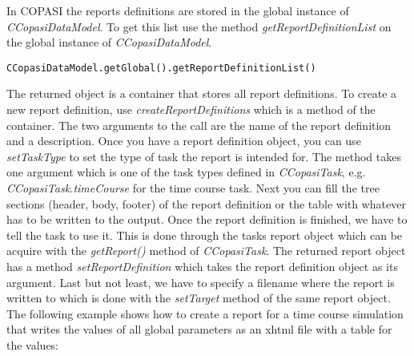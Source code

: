 \documentclass[a4,10pt]{article}
\begin{document}
In COPASI the reports definitions are stored in the global instance of \textit{CCopasiDataModel}. To get this list use the method \textit{getReportDefinitionList} on the global instance of \textit{CCopasiDataModel}.

\begin{verbatim}
CCopasiDataModel.getGlobal().getReportDefinitionList()
\end{verbatim}

The returned object is a container that stores all report definitions. To create a new report definition, use \textit{createReportDefinitions} which is a method of the container. The two arguments to the call are the name of the report definition and a description. Once you have a report definition object, you can use \textit{setTaskType} to set the type of task the report is intended for. The method takes one argument which is one of the task types defined in \textit{CCopasiTask}, e.g. \textit{CCopasiTask.timeCourse} for the time course task.
Next you can fill the tree sections (header, body, footer) of the report definition or the table  with whatever has to be written to the output.
Once the report definition is finished, we have to tell the task to use it. This is done through the tasks report object which can be acquire with the \textit{getReport()} method of \textit{CCopasiTask}. The returned report object has a method \textit{setReportDefinition} which takes the report definition object as its argument.
Last but not least, we have to specify a filename where the report is written to which is done with the \textit{setTarget} method of the same report object.
The following example shows how to create a report for a time course simulation that writes the values of all global parameters as an xhtml file with a table for the values:
\end{document}
